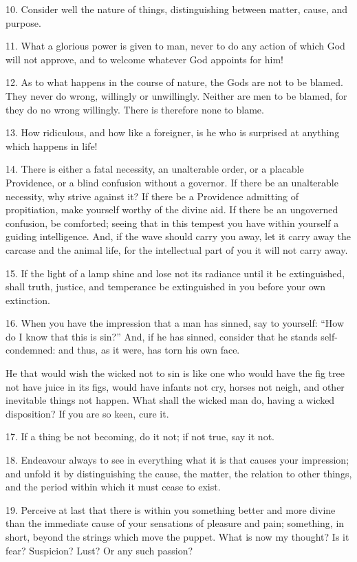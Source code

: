 \documentclass{book}
\begin{document}
10. Consider well the nature of things, distinguishing between matter,
cause, and purpose.

11. What a glorious power is given to man, never to do any action of
which God will not approve, and to welcome whatever God appoints for
him!

12. As to what happens in the course of nature, the Gods are not to be
blamed. They never do wrong, willingly or unwillingly. Neither are men
to be blamed, for they do no wrong willingly. There is therefore none
to blame.

13. How ridiculous, and how like a foreigner, is he who is surprised
at anything which happens in life!

14. There is either a fatal necessity, an unalterable order, or a
placable Providence, or a blind confusion without a governor. If there
be an unalterable necessity, why strive against it? If there be a
Providence admitting of propitiation, make yourself worthy of the
divine aid. If there be an ungoverned confusion, be comforted; seeing
that in this tempest you have within yourself a guiding
intelligence. And, if the wave should carry you away, let it carry
away the carcase and the animal life, for the intellectual part of you
it will not carry away.

15. If the light of a lamp shine and lose not its radiance until it be
extinguished, shall truth, justice, and temperance be extinguished in
you before your own extinction.

16. When you have the impression that a man has sinned, say to
yourself: ``How do I know that this is sin?'' And, if he has sinned,
consider that he stands self-condemned: and thus, as it were, has torn
his own face.

He that would wish the wicked not to sin is like one who would have
the fig tree not have juice in its figs, would have infants not cry,
horses not neigh, and other inevitable things not happen. What shall
the wicked man do, having a wicked disposition? If you are so keen,
cure it.

17. If a thing be not becoming, do it not; if not true, say it not.

18. Endeavour always to see in everything what it is that causes your
impression; and unfold it by distinguishing the cause, the matter, the
relation to other things, and the period within which it must cease to
exist.

19. Perceive at last that there is within you something better and
more divine than the immediate cause of your sensations of pleasure
and pain; something, in short, beyond the strings which move the
puppet. What is now my thought? Is it fear? Suspicion? Lust? Or any
such passion?
\end{document}
